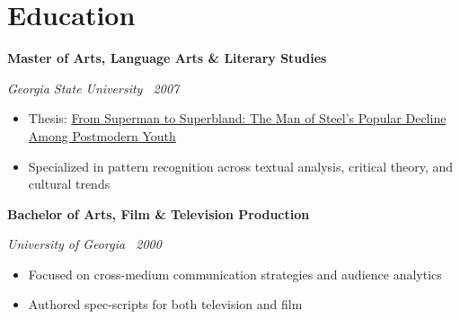 \documentclass[10pt,letterpaper]{article}
\newcommand{\edu}[3]{%
  {\sffamily\bfseries #1}\par\vspace{-0.4em}
  {\small\color{accent}\itshape #2 \textbar\ #3}\par\vspace{0.2em}
}
\begin{document}
\section{Education}
\edu{Master of Arts, Language Arts \& Literary Studies}{Georgia State University}{2007}
\begin{itemize}[leftmargin=1.5em, itemsep=0.2em, parsep=0em, topsep=0em]
  \item Thesis: \href{https://scholarworks.gsu.edu/cgi/viewcontent.cgi?article=1018&context=english_theses}{From Superman to Superbland: The Man of Steel's Popular Decline Among Postmodern Youth}
  \item Specialized in pattern recognition across textual analysis, critical theory, and cultural trends
\end{itemize}
\vspace{0.5em}
\edu{Bachelor of Arts, Film \& Television Production}{University of Georgia}{2000}
\begin{itemize}[leftmargin=1.5em, itemsep=0.2em, parsep=0em, topsep=0em]
  \item Focused on cross-medium communication strategies and audience analytics
  \item Authored spec-scripts for both television and film
\end{itemize}
\vspace{0.5em}
\end{document}
